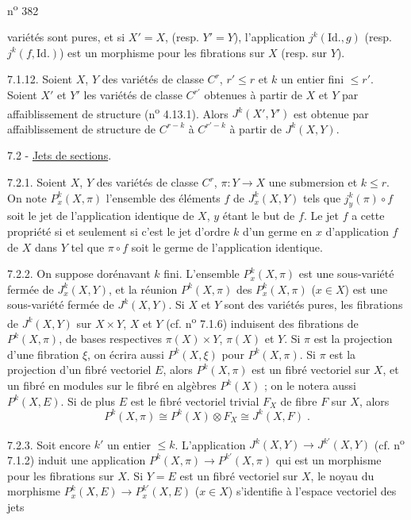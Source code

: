 \hfill n\textsuperscript{o} 382

variétés sont pures, et si $X'=X$, (resp. $Y'=Y$), l'application $j^k(\mathrm{Id}.,g)$ (resp. $j^k(f,\mathrm{Id}.)$) est un morphisme pour les fibrations sur $X$ (resp. sur $Y$).

7.1.12. Soient $X$, $Y$ des variétés de classe $C^r$, $r'\leq r$ et $k$ un entier fini $\leq r'$. Soient $X'$ et $Y'$ les variétés de classe $C^{r'}$ obtenues à partir de $X$ et $Y$ par affaiblissement de structure (n\textsuperscript{o} 4.13.1). Alors $J^k(X',Y')$ est obtenue par affaiblissement de structure de $C^{r-k}$ à $C^{r'-k}$ à partir de $J^k(X,Y)$.

7.2 - \uline{Jets de sections}.

7.2.1. Soient $X$, $Y$ des variétés de classe $C^r$, $\pi:Y\longrightarrow X$ une submersion et $k\leq r$. On note $P^k_x(X,\pi)$ l'ensemble des éléments $f$ de $J^k_x(X,Y)$ tels que $j^k_y(\pi)\circ f$ soit le jet de l'application identique de $X$, $y$ étant le but de $f$. Le jet $f$ a cette propriété si et seulement si c'est le jet d'ordre $k$ d'un germe en $x$ d'application $f$ de $X$ dans $Y$ tel que $\pi\circ f$ soit le germe de l'application identique.

7.2.2. On suppose dorénavant $k$ fini. L'ensemble $P^k_x(X,\pi)$ est une sous-variété fermée de $J^k_x(X,Y)$, et la réunion $P^k(X,\pi)$ des $P^k_x(X,\pi)$ ($x\in X$) est une sous-variété fermée de $J^k(X,Y)$. Si $X$ et $Y$ sont des variétés pures, les fibrations de $J^k(X,Y)$ sur $X\times Y$, $X$ et $Y$ (cf. n\textsuperscript{o} 7.1.6) induisent des fibrations de $P^k(X,\pi)$, de bases respectives $\pi(X)\times Y$, $\pi(X)$ et $Y$. Si $\pi$ est la projection d'une fibration $\xi$, on écrira aussi $P^k(X,\xi)$ pour $P^k(X,\pi)$. Si $\pi$ est la projection d'un fibré vectoriel $E$, alors $P^k(X,\pi)$ est un fibré vectoriel sur $X$, et un fibré en modules sur le fibré en algèbres $P^k(X)$ ; on le notera aussi $P^k(X,E)$. Si de plus $E$ est le fibré vectoriel trivial $F_X$ de fibre $F$ sur $X$, alors
\[
P^k(X,\pi)\cong P^k(X)\otimes F_X\cong J^k(X,F)\;.
\]

7.2.3. Soit encore $k'$ un entier $\leq k$. L'application $J^k(X,Y)\longrightarrow J^{k'}(X,Y)$ (cf. n\textsuperscript{o} 7.1.2) induit une application $P^k(X,\pi)\longrightarrow P^{k'}(X,\pi)$ qui est un morphisme pour les fibrations sur $X$. Si $Y=E$ est un fibré vectoriel sur $X$, le noyau du morphisme $P^k_x(X,E)\longrightarrow P^{k'}_x(X,E)$ ($x\in X$) s'identifie à l'espace vectoriel des jets
